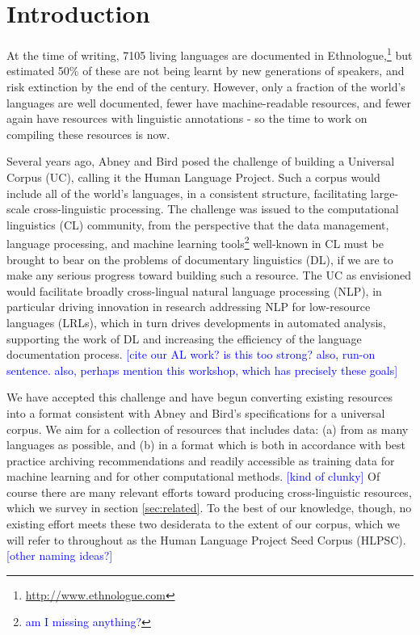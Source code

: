 \section{Introduction} \label{sec:intro}

At the time of writing, 7105 living languages are documented in Ethnologue,\footnote{\url{http://www.ethnologue.com}} but  estimated 50\% of these are not being learnt by new generations of speakers, and risk extinction by the end of the century. However, only a fraction of the world's languages are well documented, fewer have machine-readable resources, and fewer again have resources with linguistic annotations \cite{maxwell2006annotation} - so the time to work on compiling these resources is now.

Several years ago, Abney and Bird  posed the challenge of building a Universal Corpus (UC), calling it the Human Language Project. Such a corpus would include all of the world's languages, in a consistent structure, facilitating large-scale cross-linguistic processing. The challenge was issued to the computational linguistics (CL) community, from the perspective that the data management, language processing, and machine learning tools\footnote{\textcolor{blue}{am I missing anything?}} well-known in CL must be brought to bear on the problems of documentary linguistics (DL), if we are to make any serious progress toward building such a resource. The UC as envisioned would facilitate broadly cross-lingual natural language processing (NLP), in particular driving innovation in research addressing NLP for low-resource languages (LRLs), which in turn drives developments in automated analysis, supporting the work of DL and increasing the efficiency of the language documentation process. \textcolor{blue}{[cite our AL work? is this too strong? also, run-on sentence. also, perhaps mention this workshop, which has precisely these goals]}

We have accepted this challenge and have begun converting existing resources into a format consistent with Abney and Bird's specifications for a universal corpus. We aim for a collection of resources that includes data: (a) from as many languages as possible, and (b) in a format which is both in accordance with best practice archiving recommendations and readily accessible as training data for machine learning and for other computational methods. \textcolor{blue}{[kind of clunky]} Of course there are many relevant efforts toward producing cross-linguistic resources, which we survey in section \ref{sec:related}. To the best of our knowledge, though, no existing effort meets these two desiderata to the extent of our corpus, which we will refer to throughout as the Human Language Project Seed Corpus (HLPSC). \textcolor{blue}{[other naming ideas?]}

